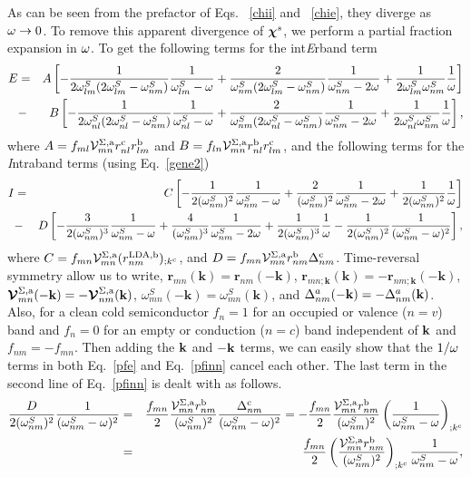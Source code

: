 \documentclass[floatfix,prb,aps,superscriptaddress,11pt,preprint]{revtex4}
\begin{document}
As can be seen from the prefactor of Eqs. ~\eqref{chii} and
~\eqref{chie}, they 
diverge as $\omega\to 0$. To remove this apparent 
divergence of $\boldsymbol{\chi}^s$, we perform
a partial fraction  expansion in $\omega$. To get the following terms for
the int{\it E}rband term 
\begin{eqnarray}\label{pfe}  
E&=&  
A
\left[
-\frac{1}{2\omega^S_{lm}(2\omega^S_{lm}-\omega^S_{nm})}\frac{1}{\omega^S_{lm}-\omega}
+\frac{2}{\omega^S_{nm}(2\omega^S_{lm}-\omega^S_{nm})}\frac{1}{\omega^S_{nm}-2\omega}
+\frac{1}{2\omega^S_{lm}\omega^S_{nm}}\frac{1}{\omega}
\right]
\nonumber\\
&-& 
B
\left[
-\frac{1}{2\omega^S_{nl}(2\omega^S_{nl}-\omega^S_{nm})}\frac{1}{\omega^S_{nl}-\omega}
+\frac{2}{\omega^S_{nm}(2\omega^S_{nl}-\omega^S_{nm})}\frac{1}{\omega^S_{nm}-2\omega}
+\frac{1}{2\omega^S_{nl}\omega^S_{nm}}\frac{1}{\omega}
\right]
,
\end{eqnarray}  
where 
$A=f_{ml}{\cal V}^{\Sigma,\mathrm{a}}_{mn}r^{\mathrm{c}}_{nl}r^{\mathrm{b}}_{lm}$   
and
$B=f_{ln}{\cal V}^{\Sigma,\mathrm{a}}_{mn}r^{\mathrm{b}}_{nl}r^{\mathrm{c}}_{lm}$,  
and the following terms for the {\it I}ntraband terms
 (using Eq.~\eqref{gene2})
\begin{eqnarray}\label{pfinn} 
I&=& 
C
\left[
-\frac{1}{2(\omega^S_{nm})^2}\frac{1}{\omega^S_{nm}-\omega}
+\frac{2}{(\omega^S_{nm})^2}\frac{1}{\omega^S_{nm}-2\omega}
+\frac{1}{2(\omega^S_{nm})^2}\frac{1}{\omega}
\right]
\nonumber\\
&-&D
\left[
-\frac{3}{2(\omega^S_{nm})^3}\frac{1}{\omega^S_{nm}-\omega}
+\frac{4}{(\omega^S_{nm})^3}\frac{1}{\omega^S_{nm}-2\omega}
+\frac{1}{2(\omega^S_{nm})^3}\frac{1}{\omega}
-\frac{1}{2(\omega^S_{nm})^2}\frac{1}{(\omega^S_{nm}-\omega)^2}
\right]
,
\end{eqnarray} 
where 
$C=f_{mn}{\cal V}^{\Sigma,\mathrm{a}}_{mn}(r^{\mathrm{LDA},\mathrm{b}}_{nm})_{;k^{\mathrm{c}}}$, 
and
$D=f_{mn}{\cal V}^{\Sigma,\mathrm{a}}_{mn}r^{\mathrm{b}}_{nm}\Delta^{\mathrm{c}}_{nm}$.
Time-reversal symmetry allow us to write,
$\mathbf{r}_{mn}(\mathbf{k})=\mathbf{r}_{nm}(-\mathbf{k})$,
$\mathbf{r}_{mn;\mathbf{k}}(\mathbf{k})=-\mathbf{r}_{nm;\mathbf{k}}(-\mathbf{k})$,
$\boldsymbol{\mathcal{\cal V}}_{mn}^{\Sigma,\mathrm{a}}(-\mathbf{k})=-\boldsymbol{\mathcal{\cal V}}_{nm}^{\Sigma,\mathrm{a}}(\mathbf{k})$,
$\omega_{mn}^{S}(-\mathbf{k})=\omega_{mn}^{S}(\mathbf{k})$,
and
$\Delta^a_{nm}(-\mathbf{k})=-\Delta^a_{nm}(\mathbf{k})$.
Also, for a clean cold semiconductor $f_n=1$  for an occupied or
valence ($n=v$) band and $f_n=0$
for an empty or conduction ($n=c$) band independent of $\mathbf{k}$ and
$f_{nm}=-f_{mn}$. 
Then adding the $\mathbf{k}$ and $-\mathbf{k}$ terms, we
can easily show that the $1/\omega$ terms in both Eq.~\eqref{pfe} and Eq.~\eqref{pfinn}
cancel each other.
The last term in the second line of Eq.~\eqref{pfinn} is dealt with as
follows.
\begin{eqnarray}\label{dresn}
\frac{D}{2(\omega^S_{nm})^2}\frac{1}{(\omega^S_{nm}-\omega)^2}
&=&
\frac{f_{mn}}{2}\frac{{\mathbf{\cal V}}^{\Sigma,\mathrm{a}}_{mn}r^{\mathrm{b}}_{nm}}{(\omega^S_{nm})^2}
\frac{\Delta^{\mathrm{c}}_{nm}}{(\omega^S_{nm}-\omega)^2} 
=
-
\frac{f_{mn}}{2}
\frac{{\mathbf{\cal V}}^{\Sigma,\mathrm{a}}_{mn}r^{\mathrm{b}}_{nm}}{(\omega^S_{nm})^2}
\left(
\frac{1}{\omega^S_{nm}-\omega}
\right)_{;k^{\mathrm{c}}}
\nonumber\\
&=&
\frac{f_{mn}}{2}
\left(
\frac{{\mathbf{\cal V}}^{\Sigma,\mathrm{a}}_{mn}r^{\mathrm{b}}_{nm}}{(\omega^S_{nm})^2}
\right)_{;k^{\mathrm{c}}}
\frac{1}{\omega^S_{nm}-\omega}
,
\end{eqnarray} 
\end{document}
